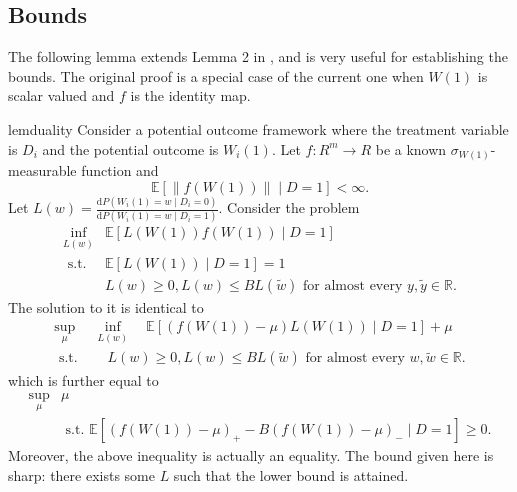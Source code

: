\documentclass[12pt]{article}
\begin{document}
	\subsection{Bounds}
	
	The following lemma extends Lemma 2 in \textcite{yadlowsky2018bounds}, and is very useful for establishing the bounds. The original proof is a special case of the current one when $W(1)$ is scalar valued and $f$ is the identity map.
	
	\begin{restatable}{lem}{duality}
		\label{duality}
		Consider a potential outcome framework where the treatment variable is $D_i$ and the potential outcome is $W_i(1)$. Let $f:R^m \to R$ be a known $\sigma_{W(1)}$-measurable function and $$\mathbb{E}[\|f(W(1))\| \mid D=1] < \infty.$$
		Let $L(w) = \frac{\mathrm{d} P(W_i(1) = w \mid D_i = 0)}{\mathrm{d} P(W_i(1) = w \mid D_i = 1)}$.
		Consider the problem \begin{equation*}
		\begin{array}{ll}
		\inf _{L(w)} & \mathbb{E}[L(W(1))f(W(1)) \mid D=1] \\
		\text { s.t. } & \mathbb{E}[L(W(1)) \mid D=1]=1 \\
		& L(w) \geq 0, L(w) \leq B L(\tilde{w}) \text { for almost every } y, \tilde{y} \in \mathbb{R}.
		\end{array}
		\end{equation*}
		The solution to it is identical to 
		\begin{equation*}
		\begin{array}{ll}
		\sup _{\mu} & \inf _{L(w)} \quad \mathbb{E}[(f(W(1))-\mu) L(W(1)) \mid D=1]+\mu \\
		\text { s.t. } &\quad  L(w) \geq 0, L(w) \leq B L(\tilde{w}) \text { for almost every } w, \tilde{w} \in \mathbb{R}.
		\end{array}
		\end{equation*}
		which is further equal to
		\begin{equation*}
		\begin{array}{ll}
		\sup _{\mu} & \mu \\
		& \text { s.t. }  \mathbb{E}\left[(f(W(1))-\mu)_{+}-B(f(W(1))-\mu)_{-} \mid D=1\right] \geq 0.
		\end{array}
		\end{equation*}
		Moreover, the above inequality is actually an equality. The bound given here is sharp: there exists some $L$ such that the lower bound is attained.
	\end{restatable} 
	
\end{document}
